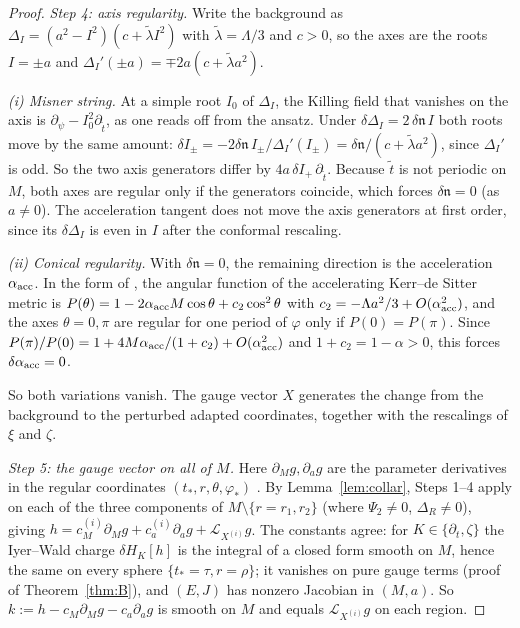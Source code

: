 \documentclass[11pt]{amsart}
\theoremstyle{definition}
\theoremstyle{remark}
\numberwithin{equation}{section}
\newcommand{\cL}{\mathcal{L}}
\begin{document}
\begin{proof}
\emph{Step 4: axis regularity.} Write the background as $\Delta_I=(a^2-I^2)(c+\tilde\lambda I^2)$ with
$\tilde\lambda=\Lambda/3$ and $c>0$, so the axes are the roots $I=\pm a$ and $\Delta_I'(\pm a)=\mp2a(c+\tilde\lambda a^2)$.

\emph{(i) Misner string.} At a simple root $I_0$ of $\Delta_I$, the Killing field that vanishes on the axis is
$\partial_\psi-I_0^2\partial_{\tilde t}$, as one reads off from the ansatz. Under $\delta\Delta_I=2\,\delta\mathfrak n\,I$
both roots move by the same amount: $\delta I_\pm=-2\delta\mathfrak n\,I_\pm/\Delta_I'(I_\pm)=\delta\mathfrak n/(c+\tilde\lambda a^2)$,
since $\Delta_I'$ is odd. So the two axis generators differ by $4a\,\delta I_+\,\partial_{\tilde t}$. Because $\tilde t$ is not
periodic on $M$, both axes are regular only if the generators coincide, which forces $\delta\mathfrak n=0$ (as
$a\ne0$). The acceleration tangent does not move the axis generators at first order, since its $\delta\Delta_I$ is even in $I$
after the conformal rescaling.

\emph{(ii) Conical regularity.} With $\delta\mathfrak n=0$, the remaining direction is the acceleration $\alpha_{\rm acc}$. In
the form of \cite{GP06}, the angular function of the accelerating Kerr--de Sitter metric is
$P(\theta)=1-2\alpha_{\rm acc}M\cos\theta+c_2\cos^2\theta$ with $c_2=-\Lambda a^2/3+O(\alpha_{\rm acc}^2)$, and the axes
$\theta=0,\pi$ are regular for one period of $\varphi$ only if $P(0)=P(\pi)$. Since
$P(\pi)/P(0)=1+4M\alpha_{\rm acc}/(1+c_2)+O(\alpha_{\rm acc}^2)$ and $1+c_2=1-\alpha>0$, this forces $\delta\alpha_{\rm acc}=0$.

So both variations vanish. The gauge vector $X$ generates the change from
the background to the perturbed adapted coordinates, together with the rescalings of $\xi$ and $\zeta$.

\emph{Step 5: the gauge vector on all of $M$.} Here $\partial_Mg,\partial_ag$ are the parameter derivatives in the
regular coordinates $(t_*,r,\theta,\varphi_*)$ \cite{HPV25}. By Lemma~\ref{lem:collar}, Steps 1--4 apply on each of the
three components of $M\setminus\{r=r_1,r_2\}$ (where $\Psi_2\ne0$, $\Delta_R\ne0$), giving
$h=c_M^{(i)}\partial_Mg+c_a^{(i)}\partial_ag+\cL_{X^{(i)}}g$. The constants agree: for $K\in\{\partial_t,\zeta\}$ the
Iyer--Wald charge $\delta H_K[h]$ is the integral of a closed form smooth on $M$, hence the same on every sphere
$\{t_*=\tau,r=\rho\}$; it vanishes on pure gauge terms (proof of Theorem~\ref{thm:B}), and $(E,J)$ has nonzero Jacobian
in $(M,a)$. So $k:=h-c_M\partial_Mg-c_a\partial_ag$ is smooth on $M$ and equals $\cL_{X^{(i)}}g$ on each region.


\end{proof}
\end{document}
